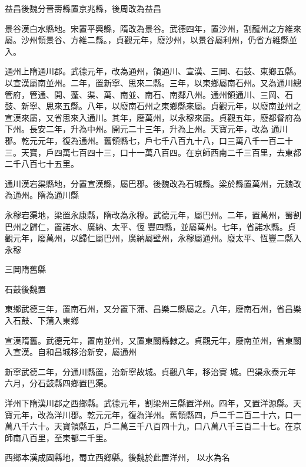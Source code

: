 \begin{pinyinscope}
 益昌後魏分晉壽縣置京兆縣，後周改為益昌



 景谷漢白水縣地。宋置平興縣，隋改為景谷。武德四年，置沙州，割龍州之方維來屬。沙州領景谷、方維二縣。，貞觀元年，廢沙州，以景谷屬利州，仍省方維縣並入。



 通州上隋通川郡。武德元年，改為通州，領通川、宣漢、三岡、石鼓、東鄉五縣。以宣漢屬南並州。二年，置新寧、思來二縣。三年，以東鄉屬南石州。又為通川總管府，管通、開、蓬、渠、萬、南並、南石、南鄰八州。通州領通川、三岡、石鼓、新寧、思來五縣。八年，以廢南石州之東鄉縣來屬。貞觀元年，以廢南並州之宣漢來屬，又省思來入通川。其年，廢萬州，以永穆來屬。貞觀五年，廢都督府為下州。長安二年，升為中州。開元二十三年，升為上州。天寶元年，改為
 通川郡。乾元元年，復為通州。舊領縣七，戶七千八百九十八，口三萬八千一百二十三。天寶，戶四萬七百四十三，口十一萬八百四。在京師西南二千三百里，去東都二千八百七十五里。



 通川漢宕渠縣地，分置宣漢縣，屬巴郡。後魏改為石城縣。梁於縣置萬州，元魏改為通州。隋為通川縣



 永穆宕渠地，梁置永康縣，隋改為永穆。武德元年，屬巴州。二年，置萬州，蜀割巴州之歸仁，置諾水、廣納、太平、恆
 豐四縣，並屬萬州。七年，省諾水縣。貞觀元年，廢萬州，以歸仁屬巴州，廣納屬壁州，永穆屬通州。廢太平、恆豐二縣入永穆



 三岡隋舊縣



 石鼓後魏置



 東鄉武德三年，置南石州，又分置下蒲、昌樂二縣屬之。八年，廢南石州，省昌樂入石鼓、下蒲入東鄉



 宣漢隋舊。武德元年，置南並州，又置東關縣隸之。貞觀元年，廢南並州，省東關入宣漢。自和昌城移治新安，屬通州



 新寧武德二年，分通川縣置，治新寧故城。貞觀八年，移治賨
 城。巴渠永泰元年六月，分石鼓縣四鄉置巴渠。



 洋州下隋漢川郡之西鄉縣。武德元年，割梁州三縣置洋州。四年，又置洋源縣。天寶元年，改為洋川郡。乾元元年，復為洋州。舊領縣四，戶二千二百二十六，口一萬八千六十。天寶領縣五，戶二萬三千八百四十九，口八萬八千三百二十七。在京師南八百里，至東都二千里。



 西鄉本漢成固縣地，蜀立西鄉縣。後魏於此置洋州，
 以水為名




\end{pinyinscope}
